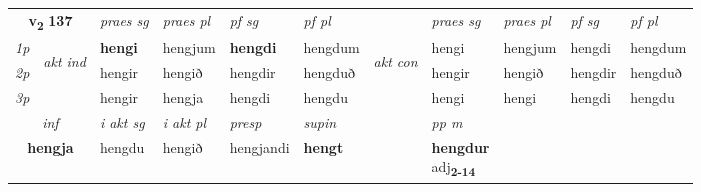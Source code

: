 \noindent
\begin{tabular}{lllllllllll} \toprule
\multicolumn{2}{c}{\textbf{v{\textsubscript{2}}} \Large{\textbf{137}}}  &  \textit{praes sg}  & \textit{praes pl}  &\textit{ pf sg} & \textit{pf pl} &  &  \textit{praes sg}  & \textit{praes pl}  & \textit{pf sg} & \textit{pf pl } \\*
	\cmidrule{3-6} \cmidrule{8-11}
 {\textit{1p}} & \multirow{3}{*}{\begin{turn}{90}\textit{akt ind}\end{turn}} & \textbf{hengi} & hengjum & \textbf{hengdi} & hengdum & \multirow{3}{*}{\begin{turn}{90}\textit{akt con}\end{turn}} &hengi & hengjum & hengdi & hengdum\\*
 {\textit{2p}} &  &  hengir  & hengið & hengdir & hengduð & & hengir & hengið & hengdir & hengduð \\*
{\textit{3p}} &  & hengir & hengja & hengdi & hengdu & & hengi & hengi& hengdi & hengdu \\*
\cmidrule{3-6} \cmidrule{8-11}

   \multicolumn{2}{c}{\textit{inf}}  & \textit{i akt sg} & \textit{i akt pl}   & \textit{presp} & \textit{supin}  && \textit{pp m} \\*
  \multicolumn{2}{c}{\textbf{hengja}} & hengdu  & hengið   & hengjandi &  \textbf{hengt}  && \specialcell{\textbf{hengdur} \\ adj\textbf{\textsubscript{2-14}}} \\*
\end{tabular}

